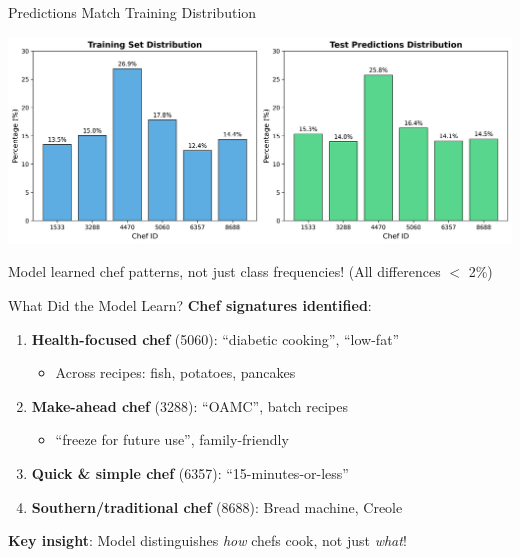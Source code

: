 \documentclass{beamer}
\begin{document}
\begin{frame}{Predictions Match Training Distribution}
\begin{center}
\includegraphics[width=\textwidth]{../results/figures/distribution_comparison.png}
\end{center}
\small Model learned chef patterns, not just class frequencies! (All differences $<$ 2\%)
\end{frame}

\begin{frame}{What Did the Model Learn?}
\textbf{Chef signatures identified}:

\begin{enumerate}
    \item \textbf{Health-focused chef} (5060): ``diabetic cooking'', ``low-fat''
    \begin{itemize}
        \item Across recipes: fish, potatoes, pancakes
    \end{itemize}
    
    \item \textbf{Make-ahead chef} (3288): ``OAMC'', batch recipes
    \begin{itemize}
        \item ``freeze for future use'', family-friendly
    \end{itemize}
    
    \item \textbf{Quick \& simple chef} (6357): ``15-minutes-or-less''
    
    \item \textbf{Southern/traditional chef} (8688): Bread machine, Creole
\end{enumerate}

\vspace{0.3cm}
\textbf{Key insight}: Model distinguishes \emph{how} chefs cook, not just \emph{what}!
\end{frame}
\end{document}
